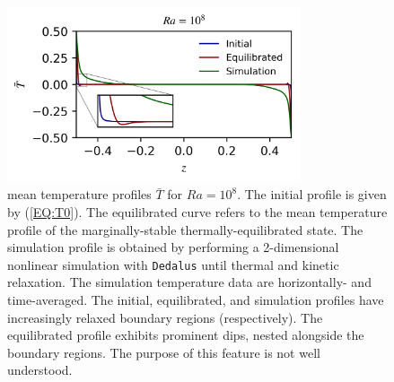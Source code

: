 \documentclass[reprint,amsmath,amssymb,aps]{revtex4-1}
\begin{document}
\begin{figure}[h]
    \centering
    \includegraphics[width=3.4in]{T_profs_na.png}
    \caption{mean temperature profiles $\bar{T}$ for $Ra = 10^8$. The initial profile is given by (\ref{EQ:T0}). The equilibrated curve refers to the mean temperature profile of the marginally-stable thermally-equilibrated state. The simulation profile is obtained by performing a 2-dimensional nonlinear simulation with \texttt{Dedalus} until thermal and kinetic relaxation. The simulation temperature data are horizontally- and time-averaged. The initial, equilibrated, and simulation profiles have increasingly relaxed boundary regions (respectively). The equilibrated profile exhibits prominent dips, nested alongside the boundary regions. The purpose of this feature is not well understood.}
    \label{fig:T0_profiles}
\end{figure}
\end{document}
